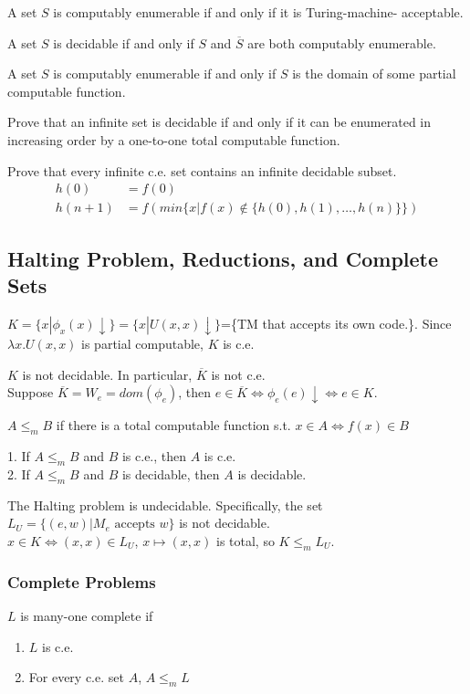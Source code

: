 A set $S$ is computably enumerable if and only if it is
Turing-machine-
acceptable.

 A set $S$ is decidable if and only if $S$ and $\overline{S}$ are both
computably
enumerable.

 A set $S$ is computably enumerable if and only if $S$ is the
domain of
some partial computable function.

 Prove that an infinite set is decidable if and only if it can
be
enumerated in increasing order by a one-to-one total computable function.

 Prove that every infinite c.e. set contains an infinite
decidable subset.
\begin{align*}
  h(0) &= f(0)\\
  h(n+1) &= f(min\{x|f(x) \notin \{h(0), h(1),\ldots, h(n)\}\})
\end{align*}


\subsection{Halting Problem, Reductions, and Complete Sets}

 $K=\{x|\phi_x(x)\downarrow\}=\{x|U(x,x)\downarrow\}$=\{TM
that accepts its own code.\}. Since $\lambda x.U(x,x)$ is partial computable,
$K$ is c.e.

 $K$ is not decidable. In particular, $\overline{K}$ is not
c.e.\\
Suppose $\overline{K} = W_e = dom(\phi_e)$, then $e \in \overline{K} \Leftrightarrow
\phi_e(e)\downarrow \Leftrightarrow e \in K$.

 $A \le_m B$ if there is a total computable function
s.t. $x \in A \Leftrightarrow f(x) \in B$

 1. If $A \le_m B$ and $B$ is c.e., then $A$ is c.e.\\
2. If $A \le_m B$ and $B$ is decidable, then $A$ is decidable.

 The Halting problem is undecidable. Specifically, the set
$L_U=\{(e,w)|M_e \text{ accepts } w\}$ is not decidable.\\
$x \in K \Leftrightarrow (x,x) \in L_U$, $x \mapsto (x,x)$ is total, so $K \le_m
L_U$.

\subsubsection{Complete Problems}
 $L$ is many-one complete if
\begin{enumerate}
  \item $L$ is c.e.
  \item For every c.e. set $A$, $A \le_m L$
\end{enumerate}

